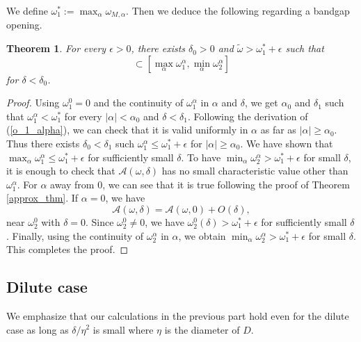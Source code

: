 \documentclass[11pt]{article}
\numberwithin{equation}{section}
\newtheorem{thm}{Theorem}[section]
\newcommand\1{{\ensuremath {\mathds 1} }}
\newcommand{\eqnref}[1]{(\ref {#1})}
\begin{document}
{{We define $\omega_1^*:= \max_{\alpha} \omega_{M,\alpha}$. Then we deduce the following regarding a bandgap opening.
\begin{thm}\label{main}
For every $\epsilon>0$, there exists $\delta_0>0$  and {$\tilde \omega>  \omega_1^*+\epsilon$} such that 
\begin{equation}
 [ \omega_1^*+\epsilon, \tilde\omega ] \subset [\max_\alpha \omega_1^\alpha, \min_\alpha \omega_2^\alpha]
 \end{equation} 
 for $\delta<\delta_0$.
\end{thm}
\begin{proof}
 Using  $\omega_1^0=0$ and the continuity of $\omega_1^\alpha$ in $\alpha$ and $\delta$, we get $\alpha_0$ and $\delta_1$ such that $\omega_1^\alpha < \omega_1^*$ for every $| \alpha|<\alpha_0$ and $\delta<\delta_1$. Following the derivation of \eqnref{o_1_alpha},  we can check that it is valid uniformly in $\alpha$ as far as $|\alpha| \ge \alpha_0$. Thus there exists $\delta_0 < \delta_1$ such $\omega_1^\alpha \le \omega_1^* +\epsilon$ for $|\alpha| \ge \alpha_0$.  We have shown that $ \max_\alpha \omega_1^\alpha \le \omega_1^*+\epsilon$ for sufficiently small $\delta$. To have  $\min_\alpha \omega_2^\alpha > \omega_1^* +\epsilon$ for small $\delta$, it is enough to check that $\mathcal{A}(\omega,\delta)$ has no small characteristic value other than $\omega_1^\alpha$. For $\alpha$ away from $0$, we can see that it is true following the proof of Theorem \ref{approx_thm}. If $\alpha=0$, we have
\begin{equation}
\mathcal{A}(\omega,\delta)=\mathcal{A}(\omega,0) + O(\delta),\end{equation}
near $\omega_2^0$ with $\delta=0$. Since  $\omega_2^0\ne 0$, we have $\omega_2^0(\delta) > \omega_1^* + \epsilon$ for sufficiently small $\delta$. Finally, using the continuity of $\omega_2^\alpha$ in $\alpha$, we obtain  $\min_\alpha \omega_2^\alpha > \omega_1^* +\epsilon$ for small $\delta$.  This completes the proof.
\end{proof}

\subsection{Dilute case}
We emphasize that our calculations in the previous part hold even for the dilute case as long as $\delta / \eta^2$ is small where $\eta$ is the diameter of $D$.

}}
\end{document}
